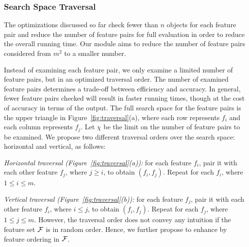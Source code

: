
\subsubsection{Search Space Traversal} \label{ssec:traversal}

The optimizations discussed so far check fewer than $n$ objects for each feature pair and reduce the number of feature pairs for full evaluation in order to reduce the overall running time. Our \traversal module aims to reduce the number of feature pairs considered from $m^2$ to a smaller number. 

 Instead of examining each feature pair, we only examine a limited number of feature pairs, but in an optimized traversal order. The number of examined feature pairs determines a trade-off between efficiency and accuracy. In general, fewer feature pairs checked will result in faster running times, though at the cost of accuracy in terms of the output.
The full search space for the feature pairs is the upper triangle in Figure~\ref{fig:traversal}(a), where each row represents $f_i$ and each column represents $f_j$. Let $\chi$ be the limit on the number of feature pairs to be examined. We propose two different traversal orders over the search space: horizontal  and vertical, as follows:
\squishlist
\item \emph{Horizontal traversal (Figure~\ref{fig:traversal}(a)):} for each feature $f_i$, pair it with each other feature $f_j$, where $j\geq i$, to obtain $(f_i,f_j)$. Repeat for each $f_i$, where $1 \leq i\leq m$.
\item \emph{Vertical traversal (Figure~\ref{fig:traversal}(b)):} for each feature $f_j$, pair it with each other feature $f_i$, where $i\leq j$, to obtain $(f_i,f_j)$. Repeat for each $f_j$, where $1 \leq j\leq m$.
\squishend
\noindent
However, the traversal order does not convey any intuition if the feature set $\ff$ is in random order. Hence, we further propose to enhance \traversal by feature ordering in $\ff$.

